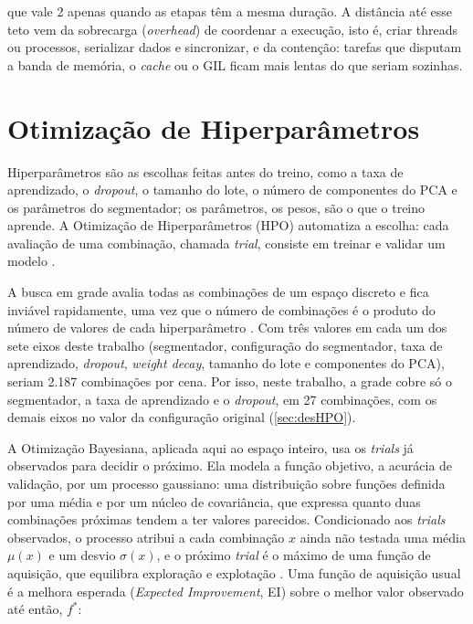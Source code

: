 \noindent que vale 2 apenas quando as etapas têm a mesma duração. A distância até esse teto vem da sobrecarga (\textit{overhead}) de coordenar a execução, isto é, criar threads ou processos, serializar dados e sincronizar, e da contenção: tarefas que disputam a banda de memória, o \textit{cache} ou o GIL ficam mais lentas do que seriam sozinhas.

\section{Otimização de Hiperparâmetros}
\label{sec:fundHPO}

Hiperparâmetros são as escolhas feitas antes do treino, como a taxa de aprendizado, o \textit{dropout}, o tamanho do lote, o número de componentes do PCA e os parâmetros do segmentador; os parâmetros, os pesos, são o que o treino aprende. A Otimização de Hiperparâmetros (HPO) automatiza a escolha: cada avaliação de uma combinação, chamada \textit{trial}, consiste em treinar e validar um modelo \cite{WU201926}.

A busca em grade avalia todas as combinações de um espaço discreto e fica inviável rapidamente, uma vez que o número de combinações é o produto do número de valores de cada hiperparâmetro \cite{liashchynskyi2019gridsearchrandomsearch}. Com três valores em cada um dos sete eixos deste trabalho (segmentador, configuração do segmentador, taxa de aprendizado, \textit{dropout}, \textit{weight decay}, tamanho do lote e componentes do PCA), seriam 2.187 combinações por cena. Por isso, neste trabalho, a grade cobre só o segmentador, a taxa de aprendizado e o \textit{dropout}, em 27 combinações, com os demais eixos no valor da configuração original (\autoref{sec:desHPO}).

A Otimização Bayesiana, aplicada aqui ao espaço inteiro, usa os \textit{trials} já observados para decidir o próximo. Ela modela a função objetivo, a acurácia de validação, por um processo gaussiano: uma distribuição sobre funções definida por uma média e por um núcleo de covariância, que expressa quanto duas combinações próximas tendem a ter valores parecidos. Condicionado aos \textit{trials} observados, o processo atribui a cada combinação $x$ ainda não testada uma média $\mu(x)$ e um desvio $\sigma(x)$, e o próximo \textit{trial} é o máximo de uma função de aquisição, que equilibra exploração e explotação \cite{WU201926}. Uma função de aquisição usual é a melhora esperada (\textit{Expected Improvement}, EI) sobre o melhor valor observado até então, $f^{*}$:

